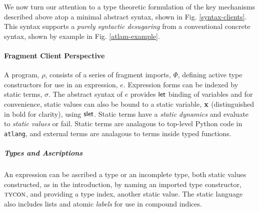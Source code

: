 \documentclass[9pt]{sigplanconf}
\newcommand{\FF}[1]{{\sf #1}}
\begin{document}


%

We now turn our attention to a type theoretic formulation of the key mechanisms described above atop a minimal abstract syntax, shown in Fig. \ref{syntax-clients}. This syntax supports a \emph{purely syntactic desugaring} from a conventional concrete syntax, shown by example in Fig. \ref{atlam-example}. 

\paragraph{Fragment Client Perspective} A program, $\rho$, consists of a series of fragment imports, $\Phi$, defining active type constructors for use in an expression, $e$. Expression forms can be indexed by static terms, $\sigma$. The abstract syntax of $e$ provides $\FF{let}$ binding of variables and for convenience, static values can also be bound to a static variable, ${\bf x}$ (distinguished in bold for clarity), using $\FF{slet}$. Static terms have a \emph{static dynamics} and evaluate to \emph{static values} or fail. Static terms are analagous to top-level Python code in \verb|atlang|, and external terms are analagous to terms inside typed functions.

\subparagraph{Types and Ascriptions} An expression can be ascribed a {type} or an {incomplete type}, both  {static values} constructed, as in the introduction, by naming an imported type constructor, $\textsc{tycon}$, and providing a type index, another static value. The static language also includes lists and atomic \emph{labels} for use in compound indices. %
\end{document}
